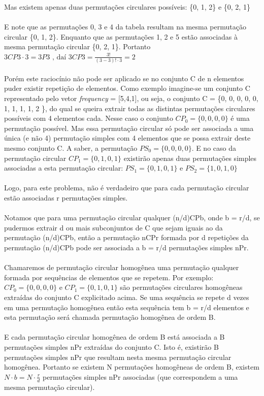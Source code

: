 \documentclass[a4paper,12pt,openany]{book}
\begin{document}
Mas existem apenas duas permutações circulares possíveis: \{0, 1, 2\} e \{0, 2, 1\}
\\
\\
E note que as permutações 0, 3 e 4 da tabela resultam na mesma permutação circular \{0, 1, 2\}. Enquanto que as permutações 1, 2 e 5 estão associadas à mesma permutação circular \{0, 2, 1\}. Portanto 
$ 3CP3 \cdot 3 = 3P3 \text{ , daí }3CP3 = \frac{3!}{(3-3)! \cdot 3} = 2 $
\\
\\
Porém este raciocínio não pode ser aplicado se no conjunto C de n elementos puder existir repetição de elementos. Como exemplo imagine-se um conjunto C representado pelo vetor \textit{frequency} = [5,4,1], ou seja, o conjunto C = \{0, 0, 0, 0, 0, 1, 1, 1, 1, 2 \}, do qual se queira extrair todas as distintas permutações circulares possíveis com 4 elementos cada. Nesse caso o conjunto $ CP_0 = \{0, 0, 0, 0\} $ é uma permutação possível. Mas essa permutação circular só pode ser associada a uma única (e não 4) permutação  simples com 4 elementos que se possa extrair deste mesmo conjunto C. A saber, a permutação $ PS_0 = \{0, 0, 0, 0\} $. E no caso da permutação circular  $ CP_1 = \{0, 1, 0, 1\} $ existirão apenas duas permutações simples associadas a esta permutação circular:  $ PS_1 = \{0, 1, 0, 1\} $ e  $ PS_2 = \{1, 0, 1, 0\} $
\\
\\
Logo, para este problema, não é verdadeiro que para cada permutação circular estão associadas r permutações simples.
\\
\\
Notamos que para uma permutação circular qualquer (n/d)CPb, onde b = r/d, se pudermos extrair d ou mais subconjuntos de C que sejam iguais ao da permutação (n/d)CPb, então a permutação nCPr formada por d repetições da permutação (n/d)CPb pode ser associada a b = r/d permutações simples nPr.
\\
\\
Chamaremos de permutação circular homogênea uma permutação qualquer formada por sequências de elementos que se repetem. Por exemplo: $ CP_0 = \{0, 0, 0, 0\} $ e  $ CP_1 = \{0, 1, 0, 1\} $ são permutações circulares homogêneas extraídas do conjunto C explicitado acima. Se uma sequência se repete d vezes em uma permutação homogênea então esta sequência tem b = r/d elementos e esta permutação será chamada permutação homogênea de ordem B.
\\
\\
E cada permutação circular homogênea de ordem B está associada a B permutações simples nPr extraídas do conjunto C. Isto é, existirão B permutações simples nPr que resultam nesta mesma permutação circular homogênea. Portanto se existem N permutações homogêneas de ordem B, existem $ N \cdot b = N \cdot \frac{r}{d} $ permutações simples nPr associadas (que correspondem a uma mesma permutação circular).
\end{document}
